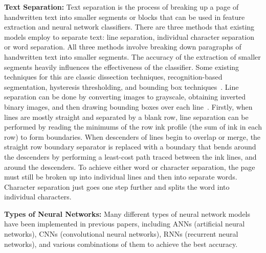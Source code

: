 \textbf{Text Separation:} Text separation is the process of breaking up a page of handwritten text into smaller segments or blocks that can be used in feature extraction and neural network classifiers. There are three methods that existing models employ to separate text: line separation, individual character separation or word separation. All three methods involve breaking down paragraphs of handwritten text into smaller segments. The accuracy of the extraction of smaller segments heavily influences the effectiveness of the classifier. Some existing techniques for this are classic dissection techniques, recognition-based segmentation, hysteresis thresholding, and bounding box techniques~\cite[p.~41]{chen2023}. Line separation can be done by converting images to grayscale, obtaining inverted binary images, and then drawing bounding boxes over each line~\cite{hemanth2022}. Firstly, when lines are mostly straight and separated by a blank row, line separation can be performed by reading the minimums of the row ink profile (the sum of ink in each row) to form boundaries. When descenders of lines begin to overlap or merge, the straight row boundary separator is replaced with a boundary that bends around the descenders by performing a least-cost path traced between the ink lines, and around the descenders.
To achieve either word or character separation, the page must still be broken up into individual lines and then into separate words. Character separation just goes one step further and splits the word into individual characters.

\textbf{Types of Neural Networks:} Many different types of neural network models have been implemented in previous papers, including ANNs (artificial neural networks), CNNs (convolutional neural networks), RNNs (recurrent neural networks), and various combinations of them to achieve the best accuracy.

